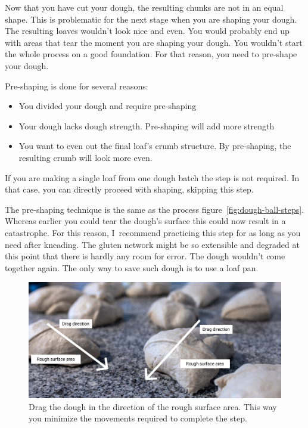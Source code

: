 Now that you have cut your dough, the resulting chunks are not in an equal shape.
This is problematic for the next stage when you are shaping your dough.
The resulting loaves wouldn't look nice and even. You would probably
end up with areas that tear the moment you are shaping your dough.
You wouldn't start the whole process on a good foundation. For that
reason, you need to pre-shape your dough.

Pre-shaping is done for several reasons:
\begin{itemize}
  \item You divided your dough and require pre-shaping
  \item Your dough lacks dough strength. Pre-shaping will add more strength
  \item You want to even out the final loaf's crumb structure. By pre-shaping,
  the resulting crumb will look more even.
\end{itemize}

If you are making a single loaf from one dough batch the step is not required.
In that case, you can directly proceed with shaping, skipping this step.

The pre-shaping technique is the same as the process figure~\ref{fig:dough-ball-steps}.
Whereas earlier you could tear the dough's surface this could now result in a catastrophe.
For this reason, I~recommend practicing this step for as long as you need after kneading.
The gluten network might be so extensible and degraded at this point that there
is hardly any room for error. The dough wouldn't come together again. The only
way to save such dough is to use a loaf pan.

\begin{figure}[!htb]
  \includegraphics[width=\textwidth]{preshape-direction}
  \caption{Drag the dough in the direction of the rough surface area. This
  way you minimize the movements required to complete the step.}%
  \label{fig:preshape-direction}
\end{figure}

